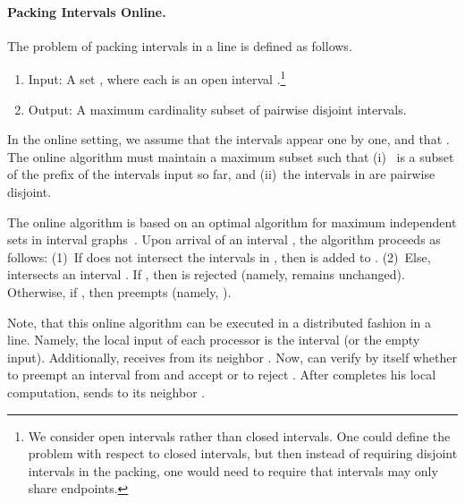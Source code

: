 \documentclass[11pt]{article}
\newenvironment{proof sketch}[1]{\noindent {\emph{Proof sketch of #1:}}}{\hfill \qed}
\begin{document}
\paragraph{Packing Intervals Online.}\label{sec:intervalp}
The problem of packing intervals in a line is defined as follows.
  \begin{enumerate}
  \item Input: A set , where each  is an open interval
    .\footnote{We consider open intervals rather than
      closed intervals. One could define the problem with respect to closed
      intervals, but then instead of requiring disjoint intervals in the packing,
      one would need to require that intervals may only share endpoints.}
          \item Output: A maximum cardinality subset  of pairwise
            disjoint intervals.
    \end{enumerate}
    In the online setting, we assume that the
    intervals appear one by one, and that . The online algorithm must maintain a maximum subset  such that
    (i)~ is a subset of the prefix of the intervals input so far, and (ii)~the
    intervals in  are pairwise disjoint.


    The online algorithm is based on an optimal algorithm for maximum independent
    sets in interval graphs~\cite{GLL}.  Upon arrival of an interval ,
    the algorithm proceeds as follows: (1)~If  does not intersect the intervals
    in , then  is added to .  (2)~Else,  intersects an interval
    . If , then  is rejected (namely,  remains
    unchanged). Otherwise, if , then  preempts  (namely,
    ).

    Note, that this online algorithm can be executed in a distributed fashion in a
    line. Namely, the local input of each processor  is the interval  (or the empty input). Additionally,  receives   from its neighbor . Now,  can verify by itself whether to preempt an interval from  and accept  or to reject . After  completes his local computation,  sends  to its neighbor .
\end{document}
